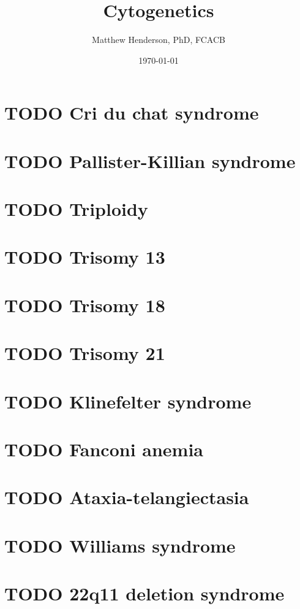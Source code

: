 \documentclass[11pt]{article}
\author{Matthew Henderson, PhD, FCACB}
\date{\today}
\title{Cytogenetics}
\begin{document}
\maketitle
\tableofcontents



\section{{\bfseries\sffamily TODO} Cri du chat syndrome}
\label{sec:orgabd364c}
\section{{\bfseries\sffamily TODO} Pallister-Killian syndrome}
\label{sec:org5cc48e6}
\section{{\bfseries\sffamily TODO} Triploidy}
\label{sec:org397dbc9}
\section{{\bfseries\sffamily TODO} Trisomy 13}
\label{sec:org138ba78}
\section{{\bfseries\sffamily TODO} Trisomy 18}
\label{sec:org3703c9f}
\section{{\bfseries\sffamily TODO} Trisomy 21}
\label{sec:org0ec11d0}
\section{{\bfseries\sffamily TODO} Klinefelter syndrome}
\label{sec:org44e53ba}
\section{{\bfseries\sffamily TODO} Fanconi anemia}
\label{sec:orgff34c6d}
\section{{\bfseries\sffamily TODO} Ataxia-telangiectasia}
\label{sec:org72cc49d}
\section{{\bfseries\sffamily TODO} Williams syndrome}
\label{sec:org216f7ce}
\section{{\bfseries\sffamily TODO} 22q11 deletion syndrome}
\label{sec:orgd09b642}
\end{document}
